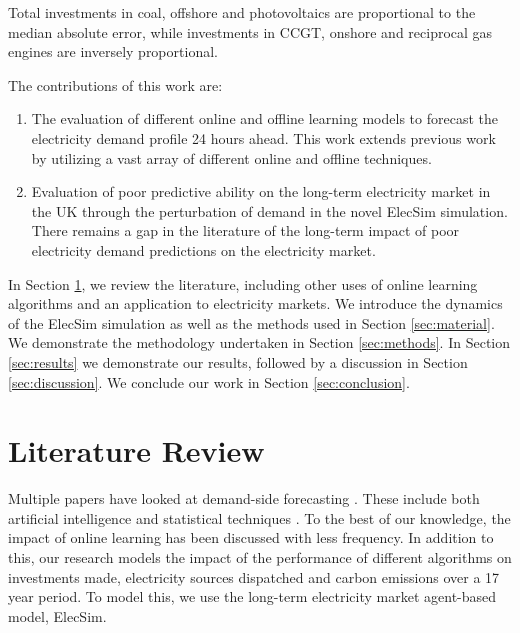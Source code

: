 \documentclass[final,3p,times,twocolumn,numbers]{elsarticle}
\begin{document}
Total investments in coal, offshore and photovoltaics are proportional to the median absolute error, while investments in CCGT, onshore and reciprocal gas engines are inversely proportional.




The contributions of this work are:

\begin{enumerate}
  \item The evaluation of different online and offline learning models to forecast the electricity demand profile 24 hours ahead. This work extends previous work by utilizing a vast array of different online and offline techniques.
  \item Evaluation of poor predictive ability on the long-term electricity market in the UK through the perturbation of demand in the novel ElecSim simulation. There remains a gap in the literature of the long-term impact of poor electricity demand predictions on the electricity market.
\end{enumerate}


 


In Section \ref{sec:lit-review}, we review the literature, including other uses of online learning algorithms and an application to electricity markets. We introduce the dynamics of the ElecSim simulation as well as the methods used in Section \ref{sec:material}. We demonstrate the methodology undertaken in Section \ref{sec:methods}. In Section \ref{sec:results} we demonstrate our results, followed by a discussion in Section \ref{sec:discussion}. We conclude our work in Section \ref{sec:conclusion}.

\section{Literature Review}
\label{sec:lit-review}

Multiple papers have looked at demand-side forecasting \cite{Singh2012}. These include both artificial intelligence \cite{Kim2000, Tiong2008,Quilumba2014} and statistical techniques \cite{Huang2003,Nguyen2017}. To the best of our knowledge, the impact of online learning has been discussed with less frequency. In addition to this, our research models the impact of the performance of different algorithms on investments made, electricity sources dispatched and carbon emissions over a 17 year period. To model this, we use the long-term electricity market agent-based model, ElecSim.
\end{document}
